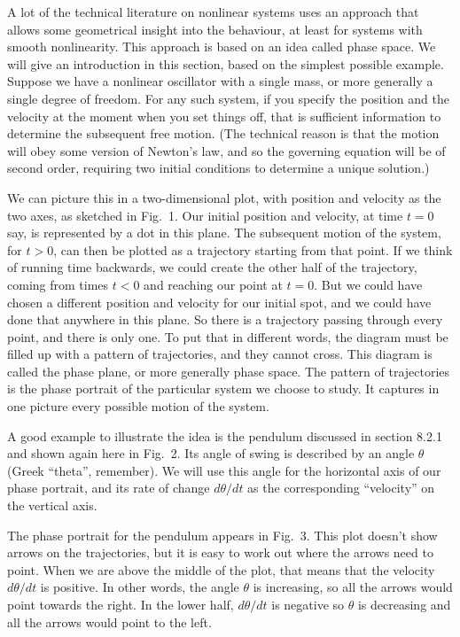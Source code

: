 

  A lot of the technical literature on nonlinear systems uses an approach that 
  allows some geometrical insight into the behaviour, at least for systems with 
  smooth nonlinearity. This approach is based on an idea called phase space. We 
  will give an introduction in this section, based on the simplest possible 
  example. Suppose we have a nonlinear oscillator with a single mass, or more 
  generally a single degree of freedom. For any such system, if you specify the 
  position and the velocity at the moment when you set things off, that is 
  sufficient information to determine the subsequent free motion. (The 
  technical reason is that the motion will obey some version of Newton’s law, 
  and so the governing equation will be of second order, requiring two initial 
  conditions to determine a unique solution.) 

  We can picture this in a two-dimensional plot, with position and velocity as 
  the two axes, as sketched in Fig.\ 1. Our initial position and velocity, at 
  time $t=0$ say, is represented by a dot in this plane. The subsequent motion 
  of the system, for $t>0$, can then be plotted as a trajectory starting from 
  that point. If we think of running time backwards, we could create the other 
  half of the trajectory, coming from times $t<0$ and reaching our point at 
  $t=0$. But we could have chosen a different position and velocity for our 
  initial spot, and we could have done that anywhere in this plane. So there is 
  a trajectory passing through every point, and there is only one. To put that 
  in different words, the diagram must be filled up with a pattern of 
  trajectories, and they cannot cross. This diagram is called the phase plane, 
  or more generally phase space. The pattern of trajectories is the phase 
  portrait of the particular system we choose to study. It captures in one 
  picture every possible motion of the system. 

  A good example to illustrate the idea is the pendulum discussed in section 
  8.2.1 and shown again here in Fig.\ 2. Its angle of swing is described by an 
  angle $\theta$ (Greek ``theta'', remember). We will use this angle for the 
  horizontal axis of our phase portrait, and its rate of change $d\theta / dt$ 
  as the corresponding ``velocity'' on the vertical axis. 

  The phase portrait for the pendulum appears in Fig.\ 3. This plot doesn't 
  show arrows on the trajectories, but it is easy to work out where the arrows 
  need to point. When we are above the middle of the plot, that means that the 
  velocity $d\theta / dt$ is positive. In other words, the angle $\theta$ is 
  increasing, so all the arrows would point towards the right. In the lower 
  half, $d\theta / dt$ is negative so $\theta$ is decreasing and all the arrows 
  would point to the left. 

